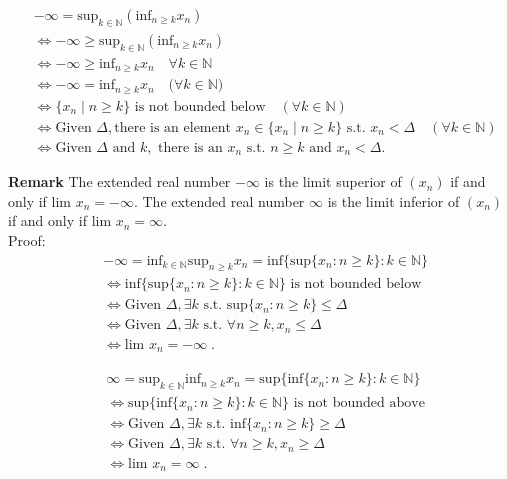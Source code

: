 \documentclass[a4paper]{article}
\begin{document}
\begin{align*}
&-\infty = \text{sup}_{k \in \mathbb{N}}(\text{inf}_{n\geq k} x_n) \\
&\iff -\infty \geq \text{sup}_{k \in \mathbb{N}}(\text{inf}_{n\geq k} x_n)\\
&\iff -\infty \geq \text{inf}_{n\geq k} x_n   \quad \forall k \in \mathbb{N}\\
&\iff -\infty=\text{inf}_{n\geq k} x_n  \quad (\forall k \in \mathbb{N)}\\
&\iff \{x_n \;|\; n\geq k\} \text{ is not bounded below} \quad (\forall k \in \mathbb{N})\\
&\iff \text{Given } \Delta, \text{there is an element } x_n \in \{x_n \;|\; n\geq k\} \text{ s.t. } x_n< \Delta \quad (\forall k \in \mathbb{N})\\
&\iff \text{Given }\Delta \text{ and } k, \text{ there is an } x_n \text{ s.t. } n\geq k \text{ and } x_n < \Delta.
\end{align*}

{\bf Remark} The extended real number $-\infty$ is the limit superior of $(x_n)$ if and only if lim $x_n = -\infty$. The extended real number $\infty$ is the limit inferior of $(x_n)$ if and only if lim $x_n = \infty$.\\

Proof:\\

\begin{align*}
&-\infty = \text{inf}_{k\in \mathbb{N}}\text{sup}_{n\geq k} x_n = \text{inf}\{\text{sup} \{x_n : n \geq k\} : k \in \mathbb{N}\}\\
&\iff \text{inf}\{\text{sup} \{x_n : n \geq k\} : k \in \mathbb{N}\} \text{ is not bounded below}\\
&\iff \text{Given } \Delta, \exists k \text{ s.t. } \text{sup}\{x_n : n \geq k\} \leq \Delta\\
&\iff \text{Given } \Delta, \exists k \text{ s.t. } \forall n\geq k, x_n \leq \Delta \\
&\iff \text{lim } x_n = -\infty\;.
\end{align*}

\begin{align*}
&\infty = \text{sup}_{k\in \mathbb{N}}\text{inf}_{n\geq k} x_n = \text{sup}\{\text{inf} \{x_n : n \geq k\} : k \in \mathbb{N}\}\\
&\iff \text{sup}\{\text{inf} \{x_n : n \geq k\} : k \in \mathbb{N}\} \text{ is not bounded above}\\
&\iff \text{Given } \Delta, \exists k \text{ s.t. } \text{inf}\{x_n : n \geq k\} \geq \Delta\\
&\iff \text{Given } \Delta, \exists k \text{ s.t. } \forall n\geq k, x_n \geq \Delta \\
&\iff \text{lim } x_n = \infty\;.
\end{align*}
\end{document}
